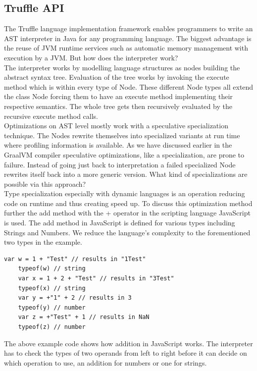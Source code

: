 \subsection{Truffle API}
The Truffle language implementation framework enables programmers to write an AST interpreter in Java for any programming language. The biggest advantage is the reuse of JVM runtime services such as automatic memory management with execution by a JVM. But how does the interpreter work?\\
The interpreter works by modelling language structures as nodes building the abstract syntax tree. Evaluation of the tree works by invoking the execute method which is within every type of Node. These different Node types all extend the class Node forcing them to have an execute method implementing their respective semantics. The whole tree gets then recursively evaluated by the recursive execute method calls.\\
Optimizations on AST level mostly work with a speculative specialization technique. The Nodes rewrite themselves into specialized variants at run time where profiling information is available. \cite{wuerthSelf} As we have discussed earlier in the GraalVM compiler speculative optimizations, like a specialization, are prone to failure. Instead of going just back to interpretation a failed specialized Node rewrites itself back into a more generic version. What kind of specializations are possible via this approach?\\
Type specialization especially with dynamic languages is an operation reducing code on runtime and thus creating speed up. To discuss this optimization method further the add method with the + operator in the scripting language JavaScript is used. The add method in JavaScript is defined for various types including Strings and Numbers. We reduce the language's complexity to the forementioned two types in the example.\\
\begin{lstlisting}[caption=JavaScript addition types minimal example]
	var w = 1 + "Test" // results in "1Test"
	typeof(w) // string
	var x = 1 + 2 + "Test" // results in "3Test"
	typeof(x) // string
	var y = +"1" + 2 // results in 3
	typeof(y) // number
	var z = +"Test" + 1 // results in NaN
	typeof(z) // number
\end{lstlisting}
The above example code shows how addition in JavaScript works. The interpreter has to check the types of two operands from left to right before it can decide on which operation to use, an addition for numbers or one for strings.\\
